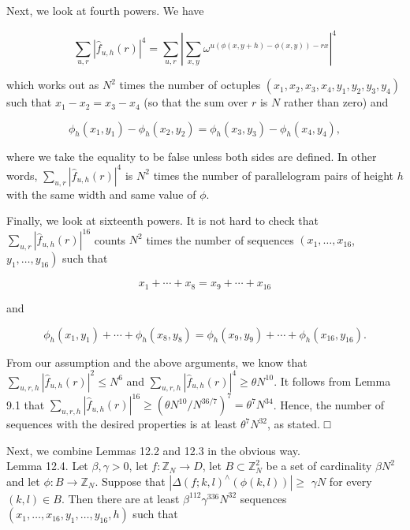 \documentclass[10pt]{article}
\begin{document}
Next, we look at fourth powers. We have

$$
\sum_{u, r}\left|\hat{f}_{u, h}(r)\right|^{4}=\sum_{u, r}\left|\sum_{x, y} \omega^{u(\phi(x, y+h)-\phi(x, y))-r x}\right|^{4}
$$

which works out as $N^{2}$ times the number of octuples $\left(x_{1}, x_{2}, x_{3}, x_{4}, y_{1}, y_{2}, y_{3}, y_{4}\right)$ such that $x_{1}-x_{2}=x_{3}-x_{4}$ (so that the sum over $r$ is $N$ rather than zero) and

$$
\phi_{h}\left(x_{1}, y_{1}\right)-\phi_{h}\left(x_{2}, y_{2}\right)=\phi_{h}\left(x_{3}, y_{3}\right)-\phi_{h}\left(x_{4}, y_{4}\right),
$$

where we take the equality to be false unless both sides are defined. In other words, $\sum_{u, r}\left|\hat{f}_{u, h}(r)\right|^{4}$ is $N^{2}$ times the number of parallelogram pairs of height $h$ with the same width and same value of $\phi$.

Finally, we look at sixteenth powers. It is not hard to check that $\sum_{u, r}\left|\hat{f}_{u, h}(r)\right|^{16}$ counts $N^{2}$ times the number of sequences $\left(x_{1}, \ldots, x_{16}\right.$, $\left.y_{1}, \ldots, y_{16}\right)$ such that

$$
x_{1}+\cdots+x_{8}=x_{9}+\cdots+x_{16}
$$

and

$$
\phi_{h}\left(x_{1}, y_{1}\right)+\cdots+\phi_{h}\left(x_{8}, y_{8}\right)=\phi_{h}\left(x_{9}, y_{9}\right)+\cdots+\phi_{h}\left(x_{16}, y_{16}\right) .
$$

From our assumption and the above arguments, we know that $\sum_{u, r, h}\left|\hat{f}_{u, h}(r)\right|^{2} \leqslant N^{6}$ and $\sum_{u, r, h}\left|\hat{f}_{u, h}(r)\right|^{4} \geqslant \theta N^{10}$. It follows from Lemma 9.1 that $\sum_{u, r, h}\left|\hat{f}_{u, h}(r)\right|^{16} \geqslant\left(\theta N^{10} / N^{36 / 7}\right)^{7}=\theta^{7} N^{34}$. Hence, the number of sequences with the desired properties is at least $\theta^{7} N^{32}$, as stated. □

Next, we combine Lemmas 12.2 and 12.3 in the obvious way.\\
Lemma 12.4. Let $\beta, \gamma>0$, let $f: \mathbb{Z}_{N} \rightarrow D$, let $B \subset \mathbb{Z}_{N}^{2}$ be a set of cardinality $\beta N^{2}$ and let $\phi: B \rightarrow \mathbb{Z}_{N}$. Suppose that $\left|\Delta(f ; k, l)^{\wedge}(\phi(k, l))\right| \geqslant$ $\gamma N$ for every $(k, l) \in B$. Then there are at least $\beta^{112} \gamma^{336} N^{32}$ sequences $\left(x_{1}, \ldots, x_{16}, y_{1}, \ldots, y_{16}, h\right)$ such that
\end{document}
